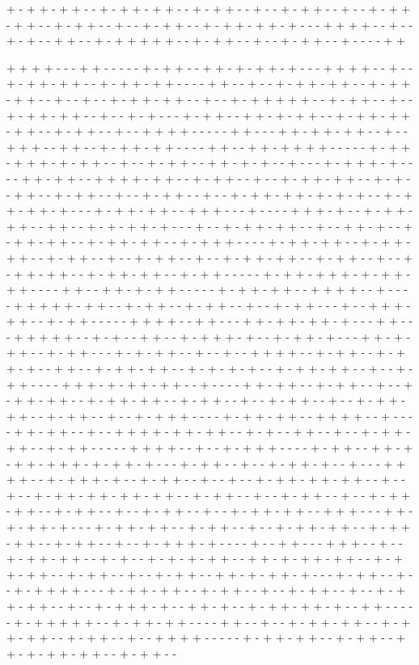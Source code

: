 + - + + - + + - - + - + + - + + - - + - + + - - + - - + - + + - - + - - + - + + - + + - - + - + + - - + - - + - + + - - + - + + - + + - + - - - + + + + - - + - - + - + - - + + - - + - + + + + + - - + - + + - - + - - + - + + - - + - - - - + + 

+ + + + - - - + + - - - - - + - + + - - + + - + - + + - + - - - + + + + - - + - - + - + + - + + - - + - + + - + + - - - - + + - - + - - + - + + - + + - - + - + + - + + - - + - - + - - + - + + - + + - - + - - + - + + + + + - - + - + + - - + - - + - + + - + + - - + - - + - + - - - + - + + - - + + - + - + + - - + - + + - + + - + + - - + - + + - - + - - + + + + - - - - - + + - - - + + - + + - + + - - + - - + + + - - + + - - + - + + - + + - - - - + + - - + + - + + + + - - - - - + - + + - + + + - + - + + - - + - - + - + + - - + + - + - + - - + - - - + - + + + - + - - - - + + - + + - - + + + + - + + - - + - + + - - + - - + - + + - + + - - + - + - - + + - - + - + + - - + - - + - + + - - + - - + - + + - + + - + - + - + - - + - + + - + + - + - - - + - + + - + + - - + + + - - - + - - - - + + + - + - - + - + + - + + - - + + - - + - + - + + - + - - - + - - + - + + - + + - - + - - + + - + - - + - + + - + + - - + - + + - + + - - + - + + + - - - - + - + + - + + - - + - + + - + + - - + - + + - - + - - + - + + - - + - - + - + + - + + - - + - + + - - + - - + - + + - + + - - + - + + - + + - - + - + + - - - - - + - + + - + + + - + - + + - + + - - - - + + - - + + - + - + + - - - - - + - + + - + + - - + + + + - - + - - - - + + + + + - + + - - + - + + - - + - + + - - + - - + - + + - - - + - - + + + - + + - - + - + + - - - - - + + + + - - + + - - - + + - + + - + + - + - - - + + - - - + + + + + - - + - + - - + + - - + - + + + - + - - + - + + - + - - - + + - + - + + - - + - + + - - - + - + - + + - - + - - + - - + + + + - - + - + + - - + - + + - + - - + + - - + - + + - + + - - + - + - + - + - - + - + + - + + - - + - - + - + + - - - - + + + - + - + + - + + - - + - - - - + + - + + - - + - + + - - + - - + - + + - + + - - + - + + - + + - - + - + + - - + - - + - + + - - + - - + - + + - + + - - + - + + - - + - - + - + + + - - - - + - + + - + + - - + + + + - - + - - - - + + - + + - - + - - + + + + - + + - + + - - + - + - - + + - - + - - + - + + - + + - - + - + + - - - - - + + + + - - + - - + - + + + - - - - + - + + - - + + - + - + + - + + + - + - + + - + - - - + - + + - - + - - + - + + - + - - + - - - + + + + - - + - + + + - + - - + - + + - - + - - + - - + - + + - + + - + + - - + - - + - - + - + + - + + - + + - + + - - + - + + - - + - - + - + + - - + - - + - + + - + + - - + - + + - - + - - + - + + - - + - - + - + + - + + - - + + + - - - + + - + - + + - + - - - + - + + - + + - - + - + + - - + - - + - + + - + + - - + - + + - + + - - + - + + - - + - - + - + + + - + - - - - + - - + + - - - + + + - - + - - + - + + - + + - - + - + - - + - + - + - + + - - + + - + - + + - + + - - + - + + - + + - - + - + + - - + - - + - + + - - + + - + - + + - + - - - + - + + - - + - - + - + + + + - - - + - + + - + + - - + - + + - - + - - + - + + - - + - - + - + + - + + - - + - - + - + + + - + - - + + - + - - + - + + - + + - + - - + + - - - - - + - + + + + + - - + - + + - + + - - - - + + - - + - - + - + + - + + - - + - + + - + + - - + - + + - - + - - + + + + - - - - - + - + + - + + - - + - + + - - + + - + - + + - + + - - + - + + - - 